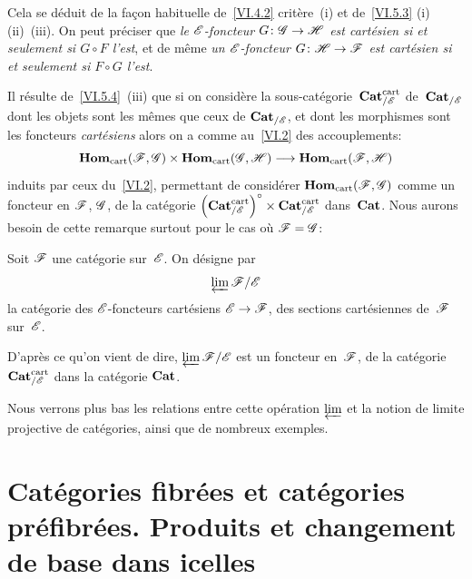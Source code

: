 Cela se d\'eduit de la fa\c con habituelle de~\ref{VI.4.2}
crit\`ere~(i) et de~\ref{VI.5.3} (i) (ii)~(iii).
On peut pr\'eciser que \emph{le $\cal{E}$-foncteur
$G\colon \cal{G} \to \cal{H}$ est cartésien si et seulement si $G
\circ F$ l'est}, et de m\^eme \emph{un $\cal{E}$-foncteur $G\colon
\cal{H} \to \cal{F}$ est cartésien si et seulement si $F \circ G$
l'est}.

Il r\'esulte de~\ref{VI.5.4}~(iii) que si on consid\`ere la
sous-cat\'egorie~$\Cat^\cart_{/\cal{E}}$
\label{indnot:fr}de~$\Cat_{/\cal{E}}$ dont les objets sont les m\^emes que ceux de
$\Cat_{/\cal{E}}$, et dont les morphismes sont les foncteurs
\emph{cartésiens} alors on a comme au~\No \ref{VI.2} des accouplements:
$$
\SheafHom_\cart(\cal{F},\cal{G})\times
\SheafHom_\cart(\cal{G},\cal{H}) \to \SheafHom_\cart(\cal{F},\cal{H})
$$
induits
par ceux du~\No \ref{VI.2}, permettant de consid\'erer
$\SheafHom_\cart(\cal{F},\cal{G})$ comme un foncteur en $\cal{F}$,
$\cal{G}$, de la cat\'egorie $\left(\Cat^\cart_{/\cal{E}}
\right)^\circ \times \Cat^\cart_{/\cal{E}}$
dans~$\mathbf{Cat}$.
Nous aurons besoin de cette remarque surtout pour le cas o\`u
$\cal{F} = \cal{G}$:

\begin{definition}
\label{VI.5.5}
Soit $\cal{F}$ une cat\'egorie sur~$\cal{E}$. On d\'esigne par
$$
\varprojLim\cal{F}/\cal{E}
$$
\label{indnot:fs}la cat\'egorie des $\cal{E}$-foncteurs cart\'esiens
$\cal{E}\to\cal{F}$, \ie des sections cart\'esiennes de~$\cal{F}$
sur~$\cal{E}$.
\end{definition}

D'apr\`es ce qu'on vient de dire,
$\varprojLim\cal{F}/\cal{E}$ est un foncteur
en~$\cal{F}$, de la cat\'egorie $\Cat^\cart_{/\cal{E}}$ dans la
cat\'egorie $\mathbf{Cat}$.

Nous verrons plus bas les relations entre cette op\'eration
$\varprojlim$ et la notion de limite projective de
cat\'egories, ainsi que de nombreux exemples.

\section[Cat\'egories fibr\'ees et cat\'egories
pr\'efibr\'ees]{Cat\'egories fibr\'ees et cat\'egories
pr\'efibr\'ees. Produits et changement de base dans icelles}
\label{VI.6}

